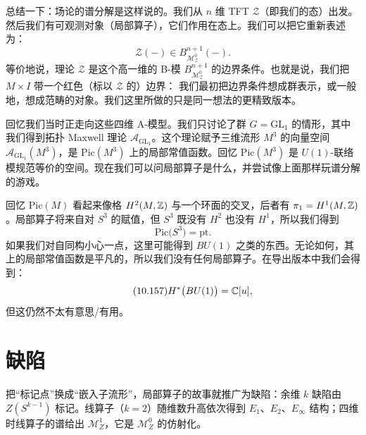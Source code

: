 总结一下：场论的谱分解是这样说的。我们从 $n$ 维 TFT $\mathcal{Z}$（即我们的态）出发。然后我们有可观测对象（局部算子），它们作用在态上。我们可以把它重新表述为：
\begin{equation}\tag{10.154}
\mathcal{Z}(-)\in B_{\mathcal{M}_{\mathcal{Z}}^{0}}^{n+1}(-).
\end{equation}
等价地说，理论 $\mathcal{Z}$ 是这个高一维的 B-模 $B_{\mathcal{M}_{\mathcal{Z}}^{0}}^{n+1}$ 的边界条件。也就是说，我们把 $M\times I$ 带一个红色（标以 $\mathcal{Z}$ 的）边界：
我们最初把边界条件想成群表示，或一般地，想成范畴的对象。我们这里所做的只是同一想法的更精致版本。

回忆我们当时正走向这些四维 A-模型。我们只讨论了群 $G=\mathrm{GL}_1$ 的情形，其中我们得到拓扑 Maxwell 理论 $\mathcal{A}_{\mathrm{GL}_1}$。这个理论赋予三维流形 $M^3$ 的向量空间 $\mathcal{A}_{\mathrm{GL}_1}(M^3)$，是 $\mathrm{Pic}(M^3)$ 上的局部常值函数。回忆 $\mathrm{Pic}(M^3)$ 是 $U(1)$-联络模规范等价的空间。现在我们可以问局部算子是什么，并尝试像上面那样玩谱分解的游戏。

回忆 $\mathrm{Pic}(M)$ 看起来像格 $H^2(M,\mathbb{Z})$ 与一个环面的交叉，后者有 $\pi_1=H^1(M,\mathbb{Z})$。局部算子将来自对 $S^3$ 的赋值，但 $S^3$ 既没有 $H^2$ 也没有 $H^1$，所以我们得到
\begin{equation}\tag{10.156}
\mathrm{Pic}\big(S^3\big)=\mathrm{pt}.
\end{equation}
如果我们对自同构小心一点，这里可能得到 $BU(1)$ 之类的东西。无论如何，其上的局部常值函数是平凡的，所以我们没有任何局部算子。在导出版本中我们会得到：
\begin{equation}\tag{10.157}
H^{*}\big(BU(1)\big)=\mathbb{C}[u],
\end{equation}
但这仍然不太有意思/有用。


\section{缺陷}\label{sec:10-8}

\begin{sectionkey}
把“标记点”换成“嵌入子流形”，局部算子的故事就推广为缺陷：余维 $k$ 缺陷由 $Z(S^{k-1})$ 标记。线算子（$k=2$）随维数升高依次得到 $E_1$、$E_2$、$E_\infty$ 结构；四维时线算子的谱给出 $\mathcal{M}^1_Z$，它是 $\mathcal{M}^0_Z$ 的仿射化。
\end{sectionkey}

